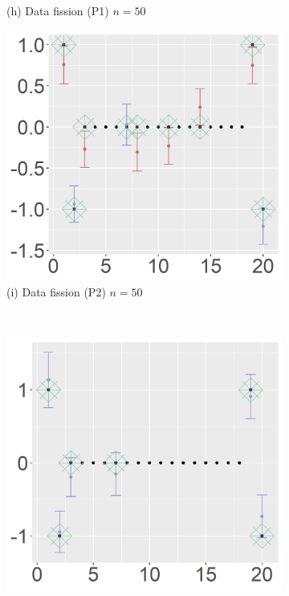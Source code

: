 \begin{figure}[ht!]
\begin{subfigure}[b]{.32\columnwidth}
    \caption{(h) Data fission (P1) $n=50$}
\end{subfigure}
\hfill
\centering
\begin{subfigure}[b]{.32\columnwidth} 
    \includegraphics[width=\columnwidth]{../../plot/p2_50_1_1.png}
    \caption{(i) Data fission (P2) $n=50$}
\end{subfigure}
\\
\centering
\begin{subfigure}[b]{.32\columnwidth} 
    \includegraphics[width=\columnwidth]{../../plot/split_100_1_1.png}

\end{subfigure}
\end{figure}
